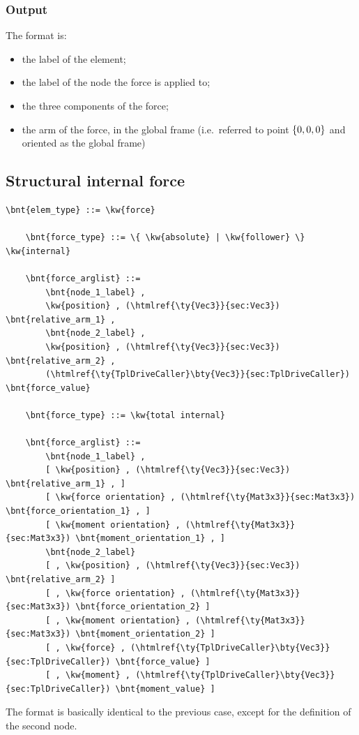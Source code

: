 \subsubsection{Output}
The format is:
\begin{itemize}
    \item the label of the element;
    \item the label of the node the force is applied to;
    \item the three components of the force;
    \item the arm of the force, in the global frame (i.e.\ referred
          to point $ \left\{ 0,0,0 \right\} $ and oriented as the global frame)
\end{itemize}

\subsection{Structural internal force}
\label{sec:EL:FORCE:STRUCTURAL:INTERNAL_FORCE}
\begin{Verbatim}[commandchars=\\\{\}]
    \bnt{elem_type} ::= \kw{force}

    \bnt{force_type} ::= \{ \kw{absolute} | \kw{follower} \} \kw{internal}

    \bnt{force_arglist} ::=
        \bnt{node_1_label} , 
        \kw{position} , (\htmlref{\ty{Vec3}}{sec:Vec3}) \bnt{relative_arm_1} ,
        \bnt{node_2_label} ,
        \kw{position} , (\htmlref{\ty{Vec3}}{sec:Vec3}) \bnt{relative_arm_2} ,
        (\htmlref{\ty{TplDriveCaller}\bty{Vec3}}{sec:TplDriveCaller}) \bnt{force_value}

    \bnt{force_type} ::= \kw{total internal}

    \bnt{force_arglist} ::=
        \bnt{node_1_label} ,
        [ \kw{position} , (\htmlref{\ty{Vec3}}{sec:Vec3}) \bnt{relative_arm_1} , ]
        [ \kw{force orientation} , (\htmlref{\ty{Mat3x3}}{sec:Mat3x3}) \bnt{force_orientation_1} , ]
        [ \kw{moment orientation} , (\htmlref{\ty{Mat3x3}}{sec:Mat3x3}) \bnt{moment_orientation_1} , ]
        \bnt{node_2_label}
        [ , \kw{position} , (\htmlref{\ty{Vec3}}{sec:Vec3}) \bnt{relative_arm_2} ]
        [ , \kw{force orientation} , (\htmlref{\ty{Mat3x3}}{sec:Mat3x3}) \bnt{force_orientation_2} ]
        [ , \kw{moment orientation} , (\htmlref{\ty{Mat3x3}}{sec:Mat3x3}) \bnt{moment_orientation_2} ]
        [ , \kw{force} , (\htmlref{\ty{TplDriveCaller}\bty{Vec3}}{sec:TplDriveCaller}) \bnt{force_value} ]
        [ , \kw{moment} , (\htmlref{\ty{TplDriveCaller}\bty{Vec3}}{sec:TplDriveCaller}) \bnt{moment_value} ]
\end{Verbatim}
The format is basically identical to the previous case,
except for the definition of the second node.


